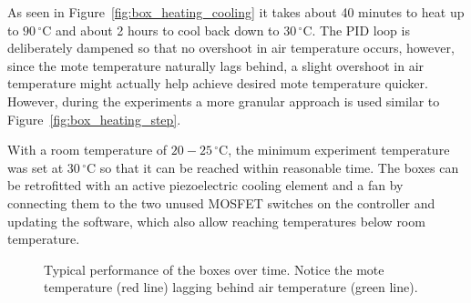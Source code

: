 As seen in Figure~\ref{fig:box_heating_cooling} it takes about 40 minutes to heat up to $90\,^{\circ}\mathrm{C}$ and about 2 hours to cool back down to $30\,^{\circ}\mathrm{C}$.
The \acs{PID} loop is deliberately dampened so that no overshoot in air temperature occurs, however, since the mote temperature naturally lags behind, a slight overshoot in air temperature might actually help achieve desired mote temperature quicker.
However, during the experiments a more granular approach is used similar to Figure~\ref{fig:box_heating_step}.

With a room temperature of $20-25\,^{\circ}\mathrm{C}$, the minimum experiment temperature was set at $30\,^{\circ}\mathrm{C}$ so that it can be reached within reasonable time.
The boxes can be retrofitted with an active piezoelectric cooling element and a fan by connecting them to the two unused \acs{MOSFET} switches on the controller and updating the software, which also allow reaching temperatures below room temperature.

\begin{figure}[H]
	\caption{Typical performance of the boxes over time. Notice the mote temperature (red line) lagging behind air temperature (green line).}
	\label{fig:box_heating_curves}
\end{figure}

